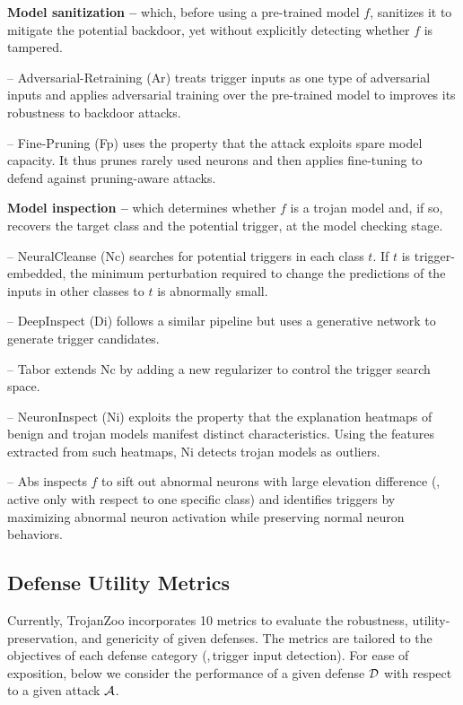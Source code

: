 \documentclass[compsoc,conference,a4paper,10pt,times]{IEEEtran}
\newcommand{\system}{{\sc \small TrojanZoo}\xspace}
\newcommand{\nc}{{\sc Nc}\xspace}
\newcommand{\ninspect}{{\sc Ni}\xspace}
\newcommand{\abs}{{\sc Abs}\xspace}
\newcommand{\tabor}{{\sc Tabor}\xspace}
\newcommand{\di}{{\sc Di}\xspace}
\newcommand{\fp}{{\sc Fp}\xspace}
\newcommand{\at}{{\sc Ar}\xspace}
\begin{document}
\vspace{2pt}
{\bf Model sanitization --} which, before using a pre-trained model $f$, sanitizes it to mitigate the potential backdoor, yet without explicitly detecting whether $f$ is tampered.

-- Adversarial-Retraining (\at) treats trigger inputs as one type of adversarial inputs and applies adversarial training over the pre-trained model to improves its robustness to backdoor attacks. 

-- Fine-Pruning (\fp) uses the property that the attack exploits spare model capacity. It thus prunes rarely used neurons and then applies fine-tuning to defend against pruning-aware attacks.

\vspace{2pt}
{\bf Model inspection --} which determines whether $f$ is a trojan model and, if so, recovers the target class and the potential trigger, at the model checking stage.

-- NeuralCleanse (\nc) searches for potential triggers in each class $t$. If $t$ is trigger-embedded, the minimum perturbation required to change the predictions of the inputs in other classes to $t$ is abnormally small. 

-- DeepInspect (\di) follows a similar pipeline but uses a generative network to generate trigger candidates. 

-- {\tabor} extends \nc by adding a new regularizer to control the trigger search space.

-- NeuronInspect (\ninspect) exploits the property that the explanation heatmaps of benign and trojan models manifest distinct characteristics. Using the features extracted from such heatmaps, \ninspect detects trojan models as outliers.

-- {\abs} inspects $f$ to sift out abnormal neurons with large elevation difference (\mie,\,active only with respect to one specific class) and identifies triggers by maximizing abnormal neuron activation while preserving normal neuron behaviors.

\subsection{Defense Utility Metrics}
\label{sec:defense-metric}


Currently, \system incorporates 10 metrics to evaluate the robustness, utility-preservation, and genericity of given defenses. The metrics are tailored to the objectives of each defense category (\meg,\,trigger input detection).
For ease of exposition, below we consider the performance of a given defense ${\mathcal{D}}$ with respect to a given attack ${\mathcal{A}}$.
\end{document}
